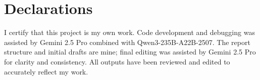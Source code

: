 
\chapter*{Declarations}

I certify that this project is my own work.
Code development and debugging was assisted by Gemini 2.5 Pro combined with Qwen3-235B-A22B-2507.
The report structure and initial drafts are mine; final editing was assisted by Gemini 2.5 Pro for clarity and consistency.
All outputs have been reviewed and edited to accurately reflect my work.